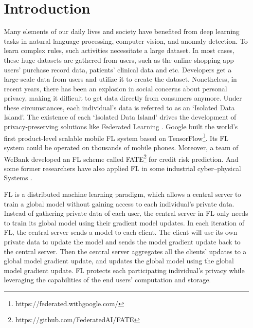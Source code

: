\documentclass[journal]{IEEEtran}
\begin{document}
\section{Introduction}
 Many elements of our daily lives and society have benefited from deep learning tasks in natural language processing, computer vision, and anomaly detection. To learn complex rules, such activities necessitate a large dataset. In most cases, these huge datasets are gathered from users, such as the online shopping app users' purchase record data, patients' clinical data and etc. Developers get a large-scale data from users and utilize it to create the dataset. Nonetheless, in recent years, there has been an explosion in social concerns about personal privacy, making it difficult to get data directly from consumers anymore. Under these circumstances, each individual's data is referred to as an `Isolated Data Island'. The existence of each `Isolated Data Island' drives the development of privacy-preserving solutions like Federated Learning \cite{ref_01_GoogleFL,ref_02_FLConcept}. Google built the world's first product-level scalable mobile FL system based on TensorFlow\footnote{https://federated.withgoogle.com/}. Its FL system could be operated on thousands of mobile phones. Moreover, a team of WeBank developed an FL scheme called FATE\footnote{https://github.com/FederatedAI/FATE} for credit risk prediction. And some former researchers have also applied FL in some industrial cyber–physical Systems \cite{ref_42_FLApp, ref_43_FLApp}.

\par FL is a distributed machine learning paradigm, which allows a central server to train a global model without gaining access to each individual's private data. Instead of gathering private data of each user, the central server in FL only needs to train its global model using their gradient model updates. In each iteration of FL, the central server sends a model to each client. The client will use its own private data to update the model and sends the model gradient update back to the central server. Then the central server aggregates all the clients' updates to a global model gradient update, and updates the global model using the global model gradient update. FL protects each participating individual's privacy while leveraging the capabilities of the end users' computation and storage.
\end{document}

